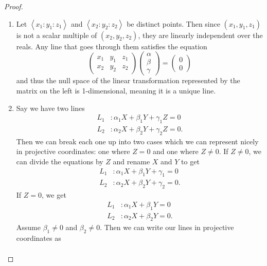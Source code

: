 \documentclass[12pt]{article}
\theoremstyle{definition}
\begin{document}
\begin{proof}\
	\begin{enumerate}[label=(\alph*)]
		\item Let $\left\langle x_1 : y_1 : z_1 \right\rangle$ and $\left\langle x_2 : y_2 : z_2 \right\rangle$ be distinct points.
		      Then since $(x_1, y_1, z_1)$ is not a scalar multiple of $(x_2, y_2, z_2)$, they are linearly independent over the reals.
		      Any line that goes through them satisfies the equation \begin{equation*}
			      \begin{pmatrix} x_1 & y_1 & z_1 \\ x_2 & y_2 & z_2 \end{pmatrix} \begin{pmatrix}
				      \alpha \\ \beta \\ \gamma
			      \end{pmatrix} = \begin{pmatrix}0 \\ 0\end{pmatrix}
		      \end{equation*}
		      and thus the null space of the linear transformation represented by the matrix on the left is 1-dimensional, meaning it is a unique line.
		\item Say we have two lines \begin{align*}
			      L_1 & : \alpha_1X + \beta_1Y + \gamma_1Z = 0  \\
			      L_2 & : \alpha_2X + \beta_2Y + \gamma_2Z = 0.
		      \end{align*}
		      Then we can break each one up into two cases which we can represent nicely in projective coordinates: one where $Z = 0$ and one where $Z \neq 0$.
		      If $Z \neq 0$, we can divide the equations by $Z$ and rename $X$ and $Y$ to get \begin{align*}
			      L_1 & : \alpha_1X + \beta_1Y + \gamma_1 = 0  \\
			      L_2 & : \alpha_2X + \beta_2Y + \gamma_2 = 0.
		      \end{align*}
		      If $Z = 0$, we get \begin{align*}
			      L_1 & : \alpha_1X + \beta_1Y = 0  \\
			      L_2 & : \alpha_2X + \beta_2Y = 0.
		      \end{align*}
		      Assume $\beta_1 \neq 0$ and $\beta_2 \neq 0$.
		      Then we can write our lines in projective coordinates as \begin{align*}

\end{align*}
\end{enumerate}
\end{proof}
\end{document}
